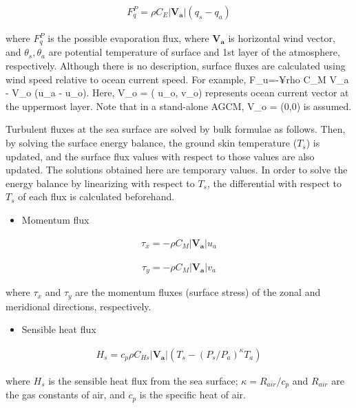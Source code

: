 \begin{eqnarray}
    F_q^P =  \rho C_E |\mathbf{V_a}| ( q_s - q_a )
\end{eqnarray}

where \(F_q^P\) is the possible evaporation flux, where \(\mathbf{V_a}\)
is horizontal wind vector, and \(\theta_s, \theta_a\) are potential
temperature of surface and 1st layer of the atmosphere, respectively.
Although there is no description, surface fluxes are calculated using
wind speed relative to ocean current speed. For example, F\_u=-¥rho C\_M
\textbar{} V\_a - V\_o \textbar{} (u\_a - u\_o). Here, V\_o = ( u\_o,
v\_o) represents ocean current vector at the uppermost layer. Note that
in a stand-alone AGCM, V\_o = (0,0) is assumed.

Turbulent fluxes at the sea surface are solved by bulk formulae as
follows. Then, by solving the surface energy balance, the ground skin
temperature (\(T_s\)) is updated, and the surface flux values with
respect to those values are also updated. The solutions obtained here
are temporary values. In order to solve the energy balance by
linearizing with respect to \(T_s\), the differential with respect to
\(T_s\) of each flux is calculated beforehand.

\begin{itemize}
\tightlist
\item
  Momentum flux
\end{itemize}

\begin{eqnarray}
 \tau_x = - \rho C_{M}|\mathbf{V_a}| u_a
\end{eqnarray}

\begin{eqnarray}
 \tau_y = - \rho C_{M}|\mathbf{V_a}| v_a
\end{eqnarray}

where \(\tau_x\) and \(\tau_y\) are the momentum fluxes (surface stress)
of the zonal and meridional directions, respectively.

\begin{itemize}
\tightlist
\item
  Sensible heat flux
\end{itemize}

\begin{eqnarray}
 H_s = c_p \rho C_{Hs}|\mathbf{V_a}| (T_s - (P_s/P_a)^{\kappa}T_a)
\end{eqnarray}

where \(H_s\) is the sensible heat flux from the sea surface;
\(\kappa = R_{air} / c_p\) and \(R_{air}\) are the gas constants of air,
and \(c_p\) is the specific heat of air.

